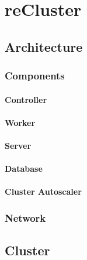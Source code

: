 \chapter{reCluster}
\label{cha:recluster}

\section{Architecture}
\label{sec:recluster_architecture}

\subsection{Components}
\label{subsec:recluster_architecture_components}

\subsubsection{Controller}
\label{subsubsec:recluster_architecture_components_controller}

\subsubsection{Worker}
\label{subsubsec:recluster_architecture_components_worker}

\subsubsection{Server}
\label{subsubsec:recluster_architecture_components_server}

\subsubsection{Database}
\label{subsubsec:recluster_architecture_components_database}

\subsubsection{Cluster Autoscaler}
\label{subsubsec:recluster_architecture_components_cluster_autoscaler}

\subsection{Network}
\label{subsec:recluster_architecture_network}

\section{Cluster}
\label{sec:recluster_cluster}

